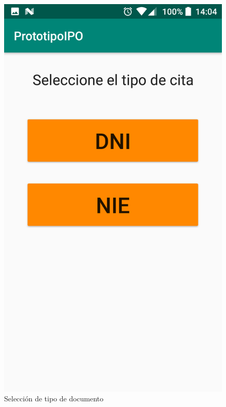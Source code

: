 \documentclass[a4paper,11pt]{article}
\begin{document}
\begin{figure}[H]
  \centering
  \includegraphics[scale=0.2]{4.png}
  \caption{Selección de tipo de documento}
  \label{fig:tipodoc}
\end{figure}
\end{document}
